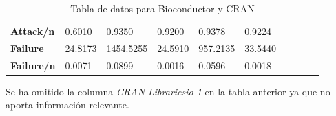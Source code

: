 \begin{table}[h!]
\begin{tabular}{|l|l|l|l|l|l|l|l|l|l|}
        \textbf{Attack/n}      & 0.6010                & 0.9350                 & 0.9200                 & 0.9378                 & 0.9224           \\
        \textbf{Failure}       & 24.8173               & 1454.5255              & 24.5910                & 957.2135               & 33.5440          \\
        \textbf{Failure/n}     & 0.0071                & 0.0899                 & 0.0016                 & 0.0596                 & 0.0018           \\
        \hline
    \end{tabular}
    \caption{Tabla de datos para Bioconductor y CRAN}
\end{table}

Se ha omitido la columna \textit{CRAN Librariesio 1} en la tabla anterior ya que no aporta información relevante.

